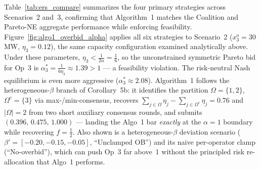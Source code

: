 \documentclass[conference]{IEEEtran}
\begin{document}
\begin{table}[hbt!]
\centering
\caption{ERS Strategy Performance Under Overbidding Scenarios ($n=3$, $a_2=0.1$, $x_L^o=400$\,MW)}
\label{tab:ers_compare}
\end{table}

Table~\ref{tab:ers_compare} summarizes the four primary strategies across Scenarios~2 and~3, confirming that Algorithm~1 matches the Coalition and Pareto-NE aggregate performance while enforcing feasibility. Figure~\ref{fig:algo1_overbid_alpha} applies all six strategies to Scenario~2 ($x_3^o=30$\,MW, $\eta_3=0.12$), the same capacity configuration examined analytically above. Under these parameters, $\eta_3 < \tfrac{1}{2n} = \tfrac{1}{6}$, so the unconstrained symmetric Pareto bid for Op~3 is $\alpha_3^* = \tfrac{1}{6\eta_3} \approx 1.39 > 1$ — a feasibility violation. The risk-neutral Nash equilibrium is even more aggressive ($\alpha_3^* \approx 2.08$). Algorithm~1 follows the heterogeneous-$\beta$ branch of Corollary~5b: it identifies the partition $\Omega=\{1,2\}$, $\Omega^c=\{3\}$ via max-/min-consensus, recovers $\sum_{j\in\Omega}\eta_j-\sum_{j\in\Omega^c}\eta_j=0.76$ and $|\Omega|=2$ from two short auxiliary consensus rounds, and submits $(0.396,\,0.475,\,1.000)$ — landing the Algo~1 bar \emph{exactly} at the $\alpha=1$ boundary while recovering $f=\frac{1}{2}$. Also shown is a heterogeneous-$\beta$ deviation scenario ($\beta'=[{-0.20},{-0.15},{-0.05}]$, ``Unclamped OB'') and its naive per-operator clamp (``No-overbid''), which can push Op~3 far above~1 without the principled risk re-allocation that Algo~1 performs.
\end{document}
